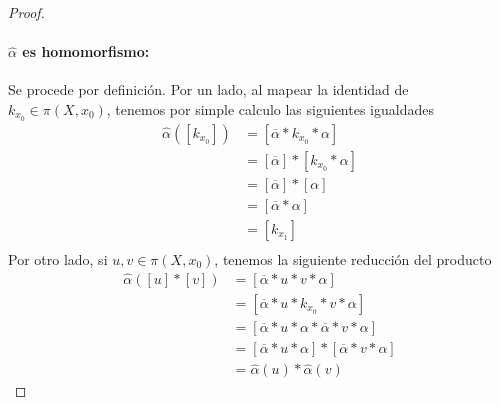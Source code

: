 {\begin{proof}
  \paragraph{\(\hat \alpha\) es homomorfismo:} Se procede por
  definición. Por un lado, al mapear la identidad de \(k_{x_0} \in \pi
  (X, x_0) \), tenemos por simple calculo las siguientes igualdades
  \begin{align*}
    \hat \alpha ([k_{x_0}])
                 &= [\overline{\alpha} * k_{x_0} * \alpha] \\
                 &= [\overline{\alpha}] * [k_{x_0} * \alpha] \\
                 &= [\overline{\alpha}] * [\alpha] \\
                 &= [\overline{\alpha} * \alpha] \\
                 &= [k_{x_1}] \\
  \end{align*}
  Por otro lado, si \(u,v \in \pi (X, x_0) \), tenemos la siguiente
  reducción del producto
  \begin{align*}
    \hat \alpha ([u] * [v]) &= [\overline{\alpha} * u * v * \alpha] \\
    &= [\overline{\alpha} * u * k_{x_0} * v * \alpha] \\
    &= [\overline{\alpha} * u * \alpha * \overline{\alpha} * v * \alpha] \\
    &= [\overline{\alpha} * u * \alpha ] * [ \overline{\alpha} * v * \alpha] \\
    &= \hat \alpha (u) * \hat \alpha (v)
  \end{align*}


\end{proof}}
